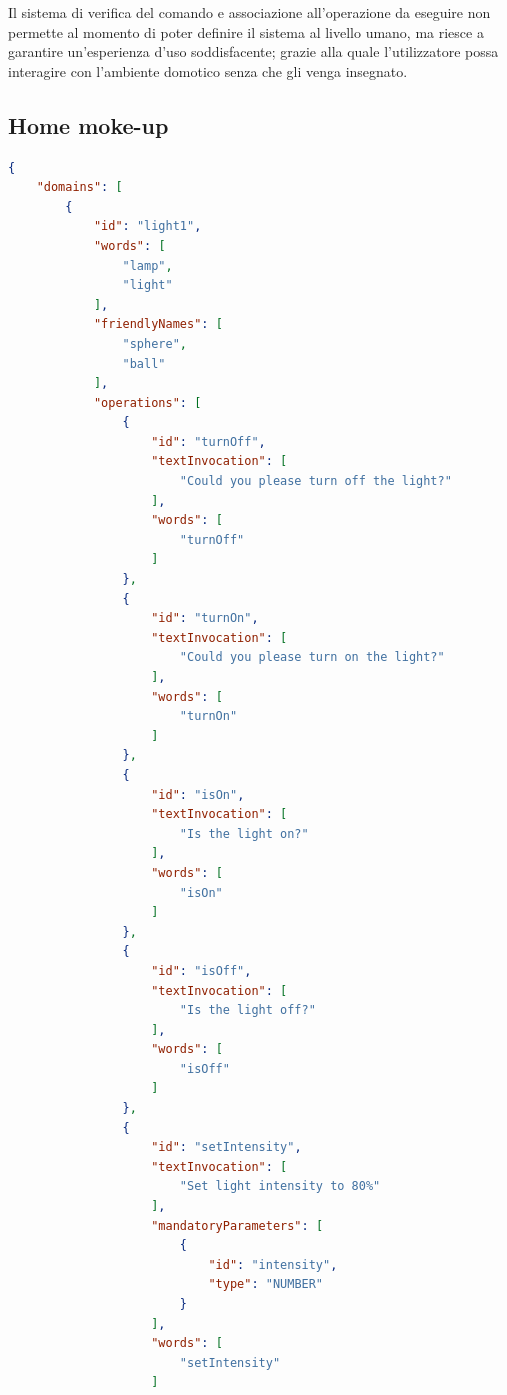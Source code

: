 \documentclass[twoside]{supsistudent}
\begin{document}
Il sistema di verifica del comando e associazione all'operazione da eseguire non permette al momento di poter definire il sistema al livello umano, ma riesce a garantire un'esperienza d'uso soddisfacente; grazie alla quale l'utilizzatore possa interagire con l'ambiente domotico senza che gli venga insegnato.





\begin{appendices}
\chapter{Home moke-up}
\begin{lstlisting}[language=json,firstnumber=1]
{
    "domains": [
        {
            "id": "light1",
            "words": [
                "lamp",
                "light"
            ],
            "friendlyNames": [
                "sphere",
                "ball"
            ],
            "operations": [
                {
                    "id": "turnOff",
                    "textInvocation": [
                        "Could you please turn off the light?"
                    ],
                    "words": [
                        "turnOff"
                    ]
                },
                {
                    "id": "turnOn",
                    "textInvocation": [
                        "Could you please turn on the light?"
                    ],
                    "words": [
                        "turnOn"
                    ]
                },
                {
                    "id": "isOn",
                    "textInvocation": [
                        "Is the light on?"
                    ],
                    "words": [
                        "isOn"
                    ]
                },
                {
                    "id": "isOff",
                    "textInvocation": [
                        "Is the light off?"
                    ],
                    "words": [
                        "isOff"
                    ]
                },
                {
                    "id": "setIntensity",
                    "textInvocation": [
                        "Set light intensity to 80%"
                    ],
                    "mandatoryParameters": [
                        {
                            "id": "intensity",
                            "type": "NUMBER"
                        }
                    ],
                    "words": [
                        "setIntensity"
                    ]

\end{lstlisting}
\end{appendices}
\end{document}
